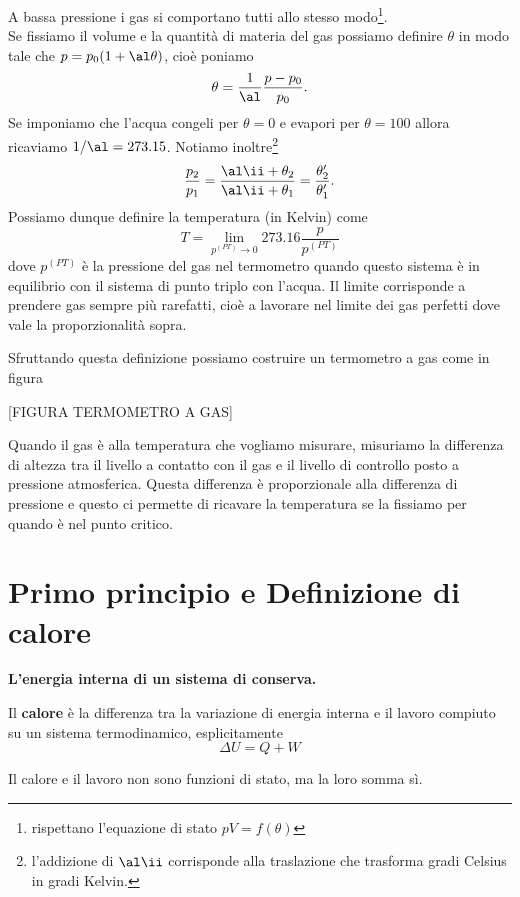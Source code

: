 \noindent
A bassa pressione i gas si comportano tutti allo stesso modo\footnote{rispettano l'equazione di stato $pV=f(\theta)$}.\\
Se fissiamo il volume e la quantit\`a di materia del gas possiamo definire $\theta$ in modo tale che $p=p_0(1+\al\theta)$, cio\`e poniamo 
\[\theta=\frac1\al\frac{p-p_0}{p_0}.\] 
Se imponiamo che l'acqua congeli per $\theta=0$ e evapori per $\theta=100$ allora ricaviamo $1/\al=273.15$. Notiamo inoltre\footnote{l'addizione di $\al\ii$ corrisponde alla traslazione che trasforma gradi Celsius in gradi Kelvin.}
\[\frac{p_2}{p_1}=\frac{\al\ii+\theta_2}{\al\ii +\theta_1}=\frac{\theta_2'}{\theta_1'}.\]
Possiamo dunque definire la temperatura (in Kelvin) come
\[T=\lim_{p^{(PT)}\to 0}273.16 \frac{p}{p^{(PT)}}\]
dove $p^{(PT)}$ \`e la pressione del gas nel termometro quando questo sistema \`e in equilibrio con il sistema di punto triplo con l'acqua. Il limite corrisponde a prendere gas sempre pi\`u rarefatti, cio\`e a lavorare nel limite dei gas perfetti dove vale la proporzionalit\`a sopra.
\medskip

\noindent Sfruttando questa definizione possiamo costruire un termometro a gas come in figura

[FIGURA TERMOMETRO A GAS]

\noindent Quando il gas \`e alla temperatura che vogliamo misurare, misuriamo la differenza di altezza tra il livello a contatto con il gas e il livello di controllo posto a pressione atmosferica. 
Questa differenza \`e proporzionale alla differenza di pressione e questo ci permette di ricavare la temperatura se la fissiamo per quando \`e nel punto critico.


\section{Primo principio e Definizione di calore}

\begin{fact}
\textbf{L'energia interna di un sistema di conserva.}
\end{fact}

\begin{definition}[Calore]
Il \textbf{calore} \`e la differenza tra la variazione di energia interna e il lavoro compiuto su un sistema termodinamico, esplicitamente
\[\boxed{\Delta U=Q+W}\]
\end{definition}

\begin{remark}
Il calore e il lavoro non sono funzioni di stato, ma la loro somma s\`i.
\end{remark}

